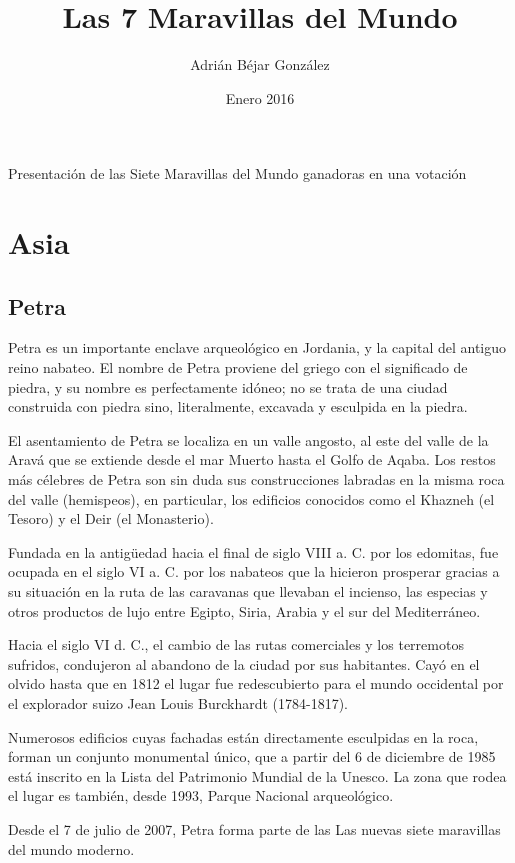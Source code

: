 \documentclass[a4paper,12pt]{article}
\begin{document}
\title{ Las 7 Maravillas del Mundo}
\author{Adrián Béjar González}
\date{Enero 2016}
\maketitle

Presentación de las Siete Maravillas del Mundo ganadoras en una votación 

\section{Asia}
 \subsection{Petra}
Petra es un importante enclave arqueológico en Jordania, y la capital del antiguo reino nabateo. El nombre de Petra proviene del griego con el significado de piedra, y su nombre es perfectamente idóneo; no se trata de una ciudad construida con piedra sino, literalmente, excavada y esculpida en la piedra.

El asentamiento de Petra se localiza en un valle angosto, al este del valle de la Aravá que se extiende desde el mar Muerto hasta el Golfo de Aqaba. Los restos más célebres de Petra son sin duda sus construcciones labradas en la misma roca del valle (hemispeos), en particular, los edificios conocidos como el Khazneh (el Tesoro) y el Deir (el Monasterio).

Fundada en la antigüedad hacia el final de siglo VIII a. C. por los edomitas, fue ocupada en el siglo VI a. C. por los nabateos que la hicieron prosperar gracias a su situación en la ruta de las caravanas que llevaban el incienso, las especias y otros productos de lujo entre Egipto, Siria, Arabia y el sur del Mediterráneo.

Hacia el siglo VI d. C., el cambio de las rutas comerciales y los terremotos sufridos, condujeron al abandono de la ciudad por sus habitantes. Cayó en el olvido hasta que en 1812 el lugar fue redescubierto para el mundo occidental por el explorador suizo Jean Louis Burckhardt (1784-1817).

Numerosos edificios cuyas fachadas están directamente esculpidas en la roca, forman un conjunto monumental único, que a partir del 6 de diciembre de 1985 está inscrito en la Lista del Patrimonio Mundial de la Unesco. La zona que rodea el lugar es también, desde 1993, Parque Nacional arqueológico.

Desde el 7 de julio de 2007, Petra forma parte de las Las nuevas siete maravillas del mundo moderno.
\end{document}
